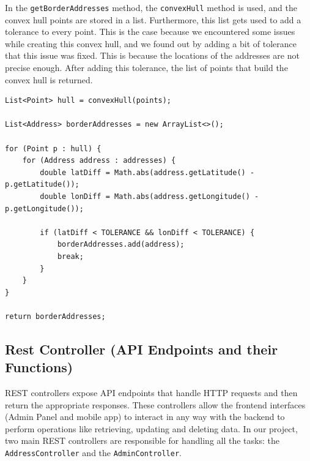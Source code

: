     In the \texttt{getBorderAddresses} method, the \texttt{convexHull} method is used, and the convex hull points are stored in a list. Furthermore, this list gets used to add a tolerance to every point. This is the case because we encountered some issues while creating this convex hull, and we found out by adding a bit of tolerance that this issue was fixed. This is because the locations of the addresses are not precise enough. After adding this tolerance, the list of points that build the convex hull is returned.
    \lstset{style=java, caption=Lowest Point Calculation}
    \begin{verbatim}
List<Point> hull = convexHull(points);

List<Address> borderAddresses = new ArrayList<>();
        
for (Point p : hull) {
    for (Address address : addresses) {
        double latDiff = Math.abs(address.getLatitude() - p.getLatitude());
        double lonDiff = Math.abs(address.getLongitude() - p.getLongitude());
        
        if (latDiff < TOLERANCE && lonDiff < TOLERANCE) {
            borderAddresses.add(address);
            break;
        }
    }
}
        
return borderAddresses;
    \end{verbatim}

    \subsection{Rest Controller (API Endpoints and their Functions)}

    REST controllers expose API endpoints that handle HTTP requests and then return the appropriate responses. These controllers allow the frontend interfaces (Admin Panel and mobile app) to interact in any way with the backend to perform operations like retrieving, updating and deleting data. In our project, two main REST controllers are responsible for handling all the tasks: the \texttt{AddressController} and the \texttt{AdminController}.

